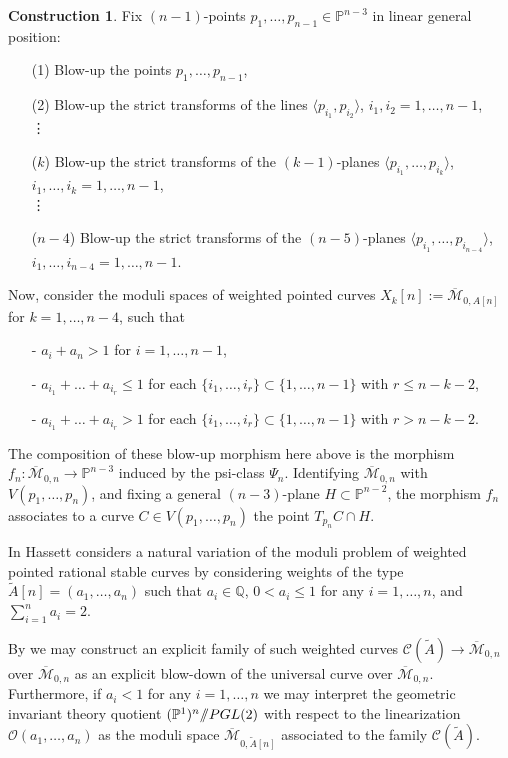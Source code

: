 \documentclass[a4paper,10pt]{amsart}
\theoremstyle{definition}
\newtheorem{Construction}[thm]{Construction}
\newcommand{\cM}{\overline{\mathcal{M}}}
\newcommand\Span[1]{\langle{#1}\rangle}
\newcommand{\quot}{/\hspace{-1.2mm}/}
\begin{document}
\begin{Construction}\label{kblusym}
Fix $(n-1)$-points $p_{1},\dots,p_{n-1}\in\mathbb{P}^{n-3}$ in linear general position:
\begin{itemize}
\item[(1)] Blow-up the points $p_{1},\dots,p_{n-1}$, 
\item[(2)] Blow-up the strict transforms of the lines $\Span{p_{i_{1}},p_{i_{2}}}$, $i_{1},i_{2} = 1,\dots,n-1$,\\
\vdots
\item[($k$)] Blow-up the strict transforms of the $(k-1)$-planes $\Span{p_{i_{1}},\dots,p_{i_{k}}}$, $i_{1},\dots,i_{k} = 1,\dots,n-1$,\\
\vdots
\item[($n-4$)] Blow-up the strict transforms of the $(n-5)$-planes $\Span{p_{i_{1}},\dots,p_{i_{n-4}}}$, $i_{1},\dots,i_{n-4} = 1,\dots,n-1$.
\end{itemize}

Now, consider the moduli spaces of weighted pointed curves $X_{k}[n]:=\cM_{0,A[n]}$ for $k = 1,\dots,n-4$, such that
\begin{itemize}
\item[-] $a_{i}+a_{n}>1$ for $i=1,\dots,n-1$,
\item[-] $a_{i_{1}}+\dots+a_{i_{r}}\leq 1$ for each $\{i_{1},\dots,i_{r}\}\subset\{1,\dots,n-1\}$ with $r\leq n-k-2$,
\item[-] $a_{i_{1}}+\dots+a_{i_{r}}> 1$ for each $\{i_{1},\dots,i_{r}\}\subset\{1,\dots,n-1\}$ with $r> n-k-2$.
\end{itemize}
The composition of these blow-up morphism here above is the morphism $f_{n}:\cM_{0,n}\rightarrow\mathbb{P}^{n-3}$ induced by the psi-class $\Psi_{n}$. Identifying $\cM_{0,n}$ with $V(p_{1},\dots,p_{n})$, and fixing a general $(n-3)$-plane $H\subset\mathbb{P}^{n-2}$, the morphism $f_{n}$ associates to a curve $C\in V(p_{1},\dots,p_{n})$ the point $T_{p_{n}}C\cap H$.
\end{Construction}
In \cite[Section 2.1.2]{Ha} Hassett considers a natural variation of the moduli problem of weighted pointed rational stable curves by considering weights of the type $\widetilde{A}[n]= (a_1,\dots,a_n)$ such that $a_{i}\in\mathbb{Q}$, $0< a_i\leq 1$ for any $i = 1,\dots,n$, and $\sum_{i=1}^{n}a_{i} =2$.

By \cite[Section 2.1.2]{Ha} we may construct an explicit family of such weighted curves $\mathcal{C}(\widetilde{A})\rightarrow\cM_{0,n}$ over $\cM_{0,n}$ as an explicit blow-down of the universal curve over $\cM_{0,n}$.\\
Furthermore, if $a_i<1$ for any $i=1,\dots,n$ we may interpret the geometric invariant theory quotient $(\mathbb{P}^1)^n\quot PGL(2)$ with respect to the linearization $\mathcal{O}(a_1,\dots,a_n)$ as the moduli space $\cM_{0,\widetilde{A}[n]}$ associated to the family $\mathcal{C}(\widetilde{A})$.
\end{document}
